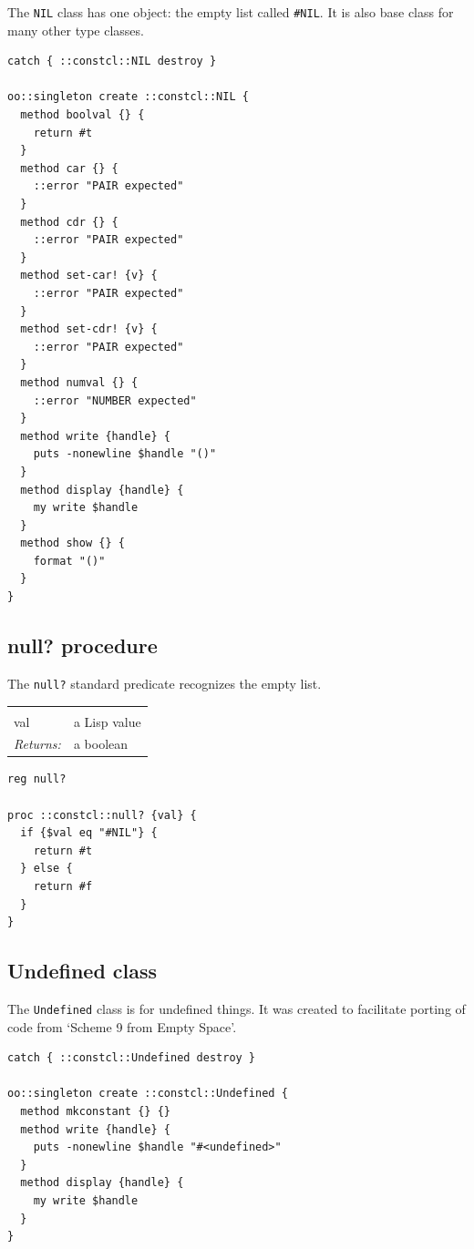 \documentclass[twoside,9pt]{report}
\begin{document}
The \texttt{NIL} class has one object: the empty list called \texttt{\#NIL}. It is also base class for many other type classes.

\begin{lstlisting}
catch { ::constcl::NIL destroy }

oo::singleton create ::constcl::NIL {
  method boolval {} {
    return #t
  }
  method car {} {
    ::error "PAIR expected"
  }
  method cdr {} {
    ::error "PAIR expected"
  }
  method set-car! {v} {
    ::error "PAIR expected"
  }
  method set-cdr! {v} {
    ::error "PAIR expected"
  }
  method numval {} {
    ::error "NUMBER expected"
  }
  method write {handle} {
    puts -nonewline $handle "()"
  }
  method display {handle} {
    my write $handle
  }
  method show {} {
    format "()"
  }
}
\end{lstlisting}
\subsection{null? procedure}
\label{null?-procedure}


The \texttt{null?} standard predicate recognizes the empty list.

\noindent\begin{tabular}{ |p{1.9cm} p{8cm}| }
\hline
\rowcolor[HTML]{CCCCCC} \multicolumn{2}{|l|}{\bf null? (public)} \\
val & a Lisp value \\
\textit{Returns:} & a boolean \\
\hline
\end{tabular}
\begin{lstlisting}
reg null?

proc ::constcl::null? {val} {
  if {$val eq "#NIL"} {
    return #t
  } else {
    return #f
  }
}
\end{lstlisting}
\subsection{Undefined class}
\label{undefined-class}


The \texttt{Undefined} class is for undefined things. It was created to facilitate porting of code from `Scheme 9 from Empty Space'.

\begin{lstlisting}
catch { ::constcl::Undefined destroy }

oo::singleton create ::constcl::Undefined {
  method mkconstant {} {}
  method write {handle} {
    puts -nonewline $handle "#<undefined>"
  }
  method display {handle} {
    my write $handle
  }
}
\end{lstlisting}
\end{document}
